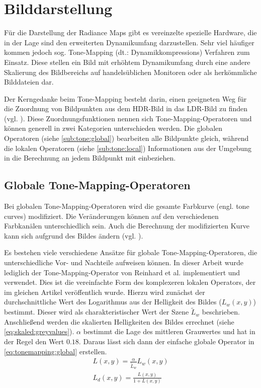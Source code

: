 \section{Bilddarstellung}
\label{subsec:ToneMapping}
 Für die Darstellung der \glspl{Radiance Map} gibt es vereinzelte spezielle Hardware, die in der Lage sind den erweiterten Dynamikumfang darzustellen. Sehr viel häufiger kommen jedoch sog. \gls{Tone-Mapping} (dt.: Dynamikkompressions) Verfahren zum Einsatz. Diese stellen ein Bild mit erhöhtem \gls{Dynamikumfang} durch eine andere Skalierung des Bildbereichs auf handelsüblichen Monitoren oder als herkömmliche Bilddateien dar. 
 
 Der Kerngedanke beim \gls{Tone-Mapping} besteht darin, einen geeigneten Weg für die Zuordnung von Bildpunkten aus dem \gls{HDR}-Bild in das \gls{LDR}-Bild zu finden (vgl. \cite[S. 145]{Bloch2012}). Diese Zuordnungsfunktionen nennen sich \gls{Tone-Mapping}-Operatoren und können generell in zwei Kategorien unterschieden werden. Die globalen Operatoren (siehe \autoref{sub:tone:global}) bearbeiten alle Bildpunkte gleich, während die lokalen Operatoren (siehe \autoref{sub:tone:local}) Informationen aus der Umgebung in die Berechnung an jedem Bildpunkt mit einbeziehen.
 

 \subsection{Globale \gls{Tone-Mapping}-Operatoren}
\label{sub:tone:global}
Bei globalen \gls{Tone-Mapping}-Operatoren wird die gesamte Farbkurve (engl. tone curves) modifiziert. Die Veränderungen können auf den verschiedenen Farbkanälen unterschiedlich sein. Auch die Berechnung der modifizierten Kurve kann sich aufgrund des Bildes ändern (vgl. \cite[S. 146]{Bloch2012}). 

Es bestehen viele verschiedene Ansätze für globale \gls{Tone-Mapping}-Operatoren, die unterschiedliche Vor- und Nachteile aufweisen können.
In dieser Arbeit wurde lediglich der \gls{Tone-Mapping}-Operator von Reinhard et al. \cite{ReinhardToneMapper} implementiert und verwendet. Dies ist die vereinfachte Form des komplexeren lokalen Operators, der im gleichen Artikel veröffentlich wurde.
Hierzu wird zunächst der durchschnittliche Wert des Logarithmus aus der Helligkeit des Bildes ($L_w(x,y)$) bestimmt. Dieser wird als charakteristischer Wert der Szene $\tilde{L}_w$ beschrieben. Anschließend werden die skalierten Helligkeiten des Bildes errechnet (siehe \autoref{eq:skaled:greyvalues}). $\alpha$ bestimmt die Lage des mittleren Grauwertes und hat in der Regel den Wert $0.18$. Daraus lässt sich dann der einfache globale Operator in \autoref{eq:tonemapping:global} erstellen.
\begin{align}
\label{eq:skaled:greyvalues}
L(x,y) = \frac{\alpha}{\tilde{L}_w} L_w(x,y)\\
\label{eq:tonemapping:global}
L_d(x, y) =\frac{L(x,y)}{1+ L(x,y)}
\end{align}


